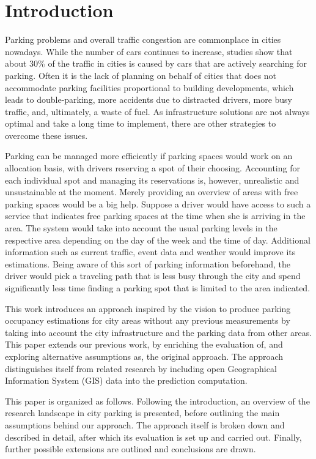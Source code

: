 \section{Introduction}
	Parking problems and overall traffic congestion are commonplace in cities nowadays. While the number of cars continues to increase\cite{car_increase}, studies show that about 30\% of the traffic in cities is caused by cars that are actively searching for parking\cite{traffic_congestion}. Often it is the lack of planning on behalf of cities that does not accommodate parking facilities proportional to building developments\cite{transport_problems}, which leads to double-parking, more accidents due to distracted drivers, more busy traffic, and, ultimately, a waste of fuel\cite{inrix_study}. As infrastructure solutions are not always optimal and take a long time to implement, there are other strategies to overcome these issues.
	
	Parking can be managed more efficiently if parking spaces would work on an allocation basis, with drivers reserving a spot of their choosing. Accounting for each individual spot and managing its reservations is, however, unrealistic and unsustainable at the moment. Merely providing an overview of areas with free parking spaces would be a big help. Suppose a driver would have access to such a service that indicates free parking spaces at the time when she is arriving in the area. The system would take into account the usual parking levels in the respective area depending on the day of the week and the time of day. Additional information such as current traffic, event data and weather would improve its estimations. Being aware of this sort of parking information beforehand, the driver would pick a traveling path that is less busy through the city and spend significantly less time finding a parking spot that is limited to the area indicated.
	
	This work introduces an approach inspired by the vision to produce parking occupancy estimations for city areas without any previous measurements by taking into account the city infrastructure and the parking data from other areas. This paper extends our previous work\cite{ionita2018park,ionita2017master}, by enriching the evaluation of, and exploring alternative assumptions as, the original approach. The approach distinguishes itself from related research by including open Geographical Information System (GIS) data into the prediction computation.
	
	This paper is organized as follows. Following the introduction, an overview of the research landscape in city parking is presented, before outlining the main assumptions behind our approach. The approach itself is broken down and described in detail, after which its evaluation is set up and carried out. Finally, further possible extensions are outlined and conclusions are drawn.

